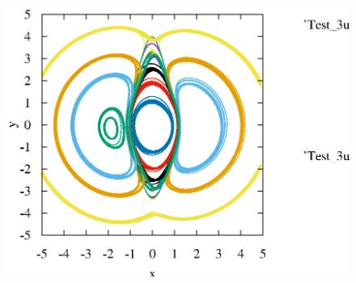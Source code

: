 \documentclass[aps,prl,reprint,groupedaddress]{revtex4-1}
\begin{document}
\begin{figure}
\includegraphics{Test_3up_1=1}%
\caption{\label{}}
\end{figure}


%
\end{document}
